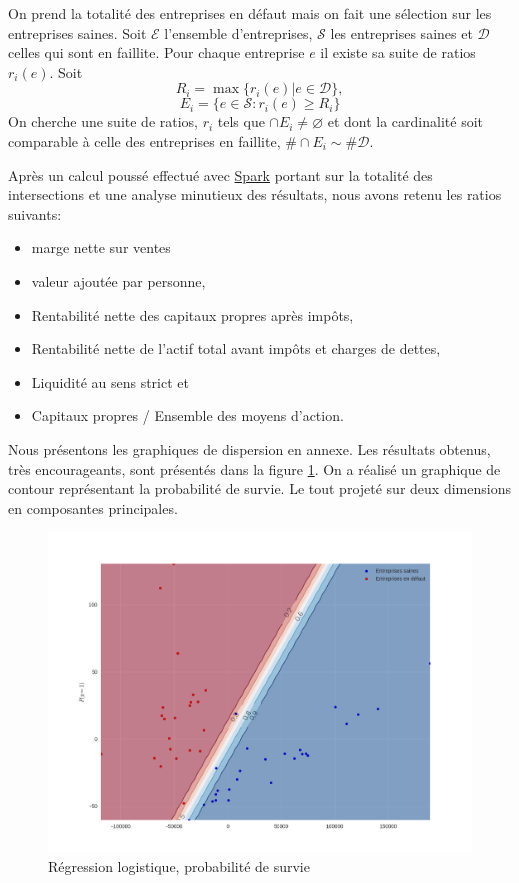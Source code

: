 \documentclass[DIV=calc, paper=a4, fontsize=11pt, twocolumn]{scrartcl}
\begin{document}
On prend la totalité des entreprises en défaut mais on fait une sélection sur les entreprises saines.
Soit $\mathcal{E}$ l'ensemble d'entreprises, $\mathcal{S}$ les entreprises saines et $\mathcal{D}$ celles qui sont en faillite. Pour chaque entreprise $e$ il existe sa suite de ratios $r_i(e)$. Soit
$$R_i = \max \{ r_i(e) | e \in \mathcal{D} \},$$
$$E_i = \{ e \in \mathcal{S} : r_i(e) \geq R_i \}$$
On cherche une suite de ratios, $r_i$ tels que $\cap E_i \neq \varnothing$ et dont la cardinalité soit comparable à celle des entreprises en faillite, $\#\cap E_i \sim \#\mathcal{D}$. 

Après un calcul poussé effectué avec \href{http://spark.apache.org/}{Spark} portant sur la totalité des intersections et une analyse minutieux des résultats, nous avons retenu les ratios suivants:
\begin{itemize}
\item marge nette sur ventes
\item valeur ajoutée par personne, 
\item Rentabilité nette des capitaux propres après impôts,
\item Rentabilité nette de l’actif total avant impôts et charges de dettes,
\item Liquidité au sens strict et
\item Capitaux propres / Ensemble des moyens d’action.
\end{itemize}
Nous présentons les graphiques de dispersion en annexe.
Les résultats obtenus, très encourageants, sont présentés dans la figure \ref{fig:reglogsample}. On a réalisé un graphique de contour représentant la probabilité de survie. Le tout projeté sur deux dimensions en composantes principales.
\begin{figure}
  \centering
    \includegraphics[width=\linewidth]{reglogsample}
  \caption{Régression logistique, probabilité de survie}
  \label{fig:reglogsample}
\end{figure}
\end{document}
